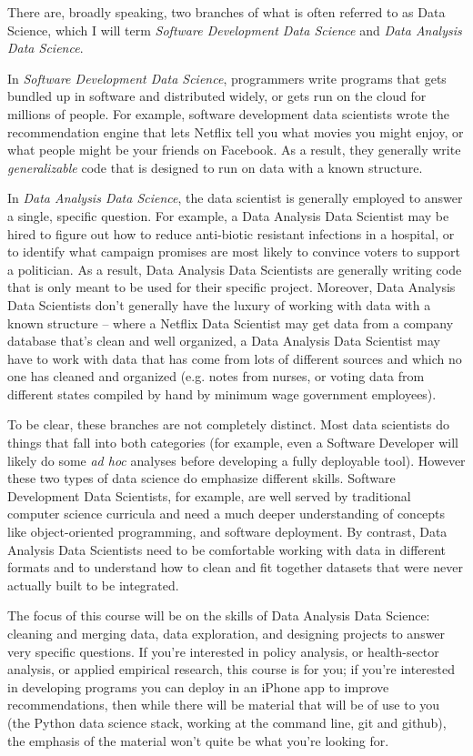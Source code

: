 \documentclass[12pt]{article}
\begin{document}
There are, broadly speaking, two branches of what is often referred to as Data Science, which I will term \emph{Software Development Data Science} and \emph{Data Analysis Data Science}.

In \emph{Software Development Data Science}, programmers write programs that gets bundled up in software and distributed widely, or gets run on the cloud for millions of people. For example, software development data scientists wrote the recommendation engine that lets Netflix tell you what movies you might enjoy, or what people might be your friends on Facebook. As a result, they generally write \emph{generalizable} code that is designed to run on data with a known structure.

In \emph{Data Analysis Data Science}, the data scientist is generally employed to answer a single, specific question. For example, a Data Analysis Data Scientist may be hired to figure out how to reduce anti-biotic resistant infections in a hospital, or to identify what campaign promises are most likely to convince voters to support a politician. As a result, Data Analysis Data Scientists are generally writing code that is only meant to be used for their specific project. Moreover, Data Analysis Data Scientists don't generally have the luxury of working with data with a known structure -- where a Netflix Data Scientist may get data from a company database that's clean and well organized, a Data Analysis Data Scientist may have to work with data that has come from lots of different sources and which no one has cleaned and organized (e.g. notes from nurses, or voting data from different states compiled by hand by minimum wage government employees).

To be clear, these branches are not completely distinct. Most data scientists do things that fall into both categories (for example, even a Software Developer will likely do some \emph{ad hoc} analyses before developing a fully deployable tool). However these two types of data science do emphasize different skills. Software Development Data Scientists, for example, are well served by traditional computer science curricula and need a much deeper understanding of concepts like object-oriented programming, and software deployment. By contrast, Data Analysis Data Scientists need to be comfortable working with data in different formats and to understand how to clean and fit together datasets that were never actually built to be integrated.

The focus of this course will be on the skills of Data Analysis Data Science: cleaning and merging data, data exploration, and designing projects to answer very specific questions. If you're interested in policy analysis, or health-sector analysis, or applied empirical research, this course is for you; if you're interested in developing programs you can deploy in an iPhone app to improve recommendations, then while there will be material that will be of use to you (the Python data science stack, working at the command line, git and github), the emphasis of the material won't quite be what you're looking for.
\end{document}
